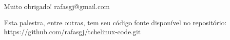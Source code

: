 \documentclass[aspect=43,14pt]{beamer}
\begin{document}
{%
\usebackgroundtemplate{ }
\begin{frame}
    
    \vfill
    \huge Muito obrigado!
    \vfill
    \large rafasgj@gmail.com
    \vfill

\end{frame}
}

\begin{frame}
\begin{center}
    \vfill
    Esta palestra, entre outras, tem seu código fonte disponível no repositório:
    \vfill
    https://github.com/rafasgj/tchelinux-code.git
    \vfill
\end{center}
\end{frame}
\end{document}
